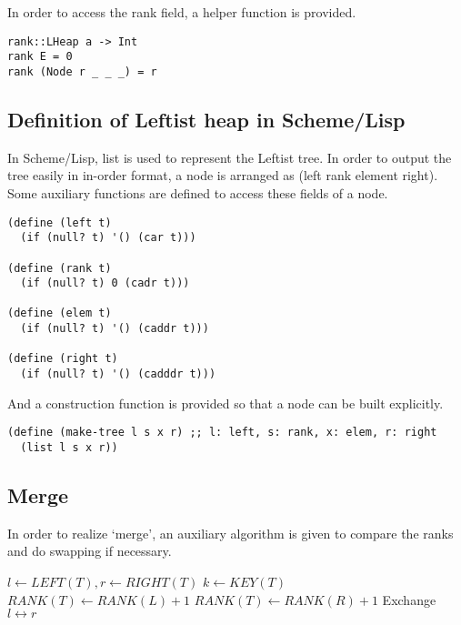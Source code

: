 \documentclass{article}
\begin{document}
In order to access the rank field, a helper function is provided.

\begin{lstlisting}
rank::LHeap a -> Int
rank E = 0
rank (Node r _ _ _) = r
\end{lstlisting}

\subsection*{Definition of Leftist heap in Scheme/Lisp}

In Scheme/Lisp, list is used to represent the Leftist tree. In order
to output the tree easily in in-order format, a node is arranged as
(left rank element right). Some auxiliary functions are defined 
to access these fields of a node.

\lstset{language=lisp}
\begin{lstlisting}
(define (left t)
  (if (null? t) '() (car t)))

(define (rank t)
  (if (null? t) 0 (cadr t)))

(define (elem t)
  (if (null? t) '() (caddr t)))

(define (right t)
  (if (null? t) '() (cadddr t)))
\end{lstlisting}

And a construction function is provided so that a node can be 
built explicitly.

\begin{lstlisting}
(define (make-tree l s x r) ;; l: left, s: rank, x: elem, r: right
  (list l s x r))
\end{lstlisting}

\subsection{Merge}

In order to realize `merge', an auxiliary algorithm is given to 
compare the ranks and do swapping if necessary.

\begin{algorithmic}[1]
  \State $l \gets LEFT(T), r \gets RIGHT(T)$
  \State $k \gets KEY(T)$
    \State $RANK(T) \gets RANK(L) + 1$
  \Else
    \State $RANK(T) \gets RANK(R) + 1$
    \State Exchange $l \leftrightarrow r$
  \EndIf
\EndFunction
\end{algorithmic}
\end{document}
